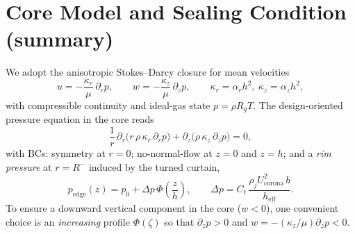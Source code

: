 \documentclass[11pt,a4paper]{article}
\begin{document}
\section{Core Model and Sealing Condition (summary)}
We adopt the anisotropic Stokes--Darcy closure for mean velocities
\begin{equation}
  u = -\frac{\kappa_r}{\mu}\,\partial_r p,\qquad
  w = -\frac{\kappa_z}{\mu}\,\partial_z p,\qquad
  \kappa_r=\alpha_r h^2,\ \kappa_z=\alpha_z h^2,
\end{equation}
with compressible continuity and ideal-gas state $p=\rho R_g T$.
The design-oriented pressure equation in the core reads
\begin{equation}
  \frac{1}{r}\,\partial_r\!\big(r\,\rho\,\kappa_r\,\partial_r p\big)+\partial_z\!\big(\rho\,\kappa_z\,\partial_z p\big)=0,
\end{equation}
with BCs: symmetry at $r=0$; no-normal-flow at $z=0$ and $z=h$; and a \emph{rim pressure} at $r=R^{-}$ induced by the turned curtain,
\begin{equation}
  p_{\mathrm{edge}}(z)=p_0 + \Delta p\,\Phi\!\left(\frac{z}{h}\right),\qquad
  \Delta p = C_t\,\frac{\rho_j U_{\mathrm{corona}}^2\,b}{h_{\mathrm{eff}}}.
\end{equation}
To ensure a downward vertical component in the core ($w<0$), one convenient choice is an \emph{increasing} profile $\Phi(\zeta)$ so that $\partial_z p>0$ and $w=-(\kappa_z/\mu)\partial_z p<0$.
\end{document}
